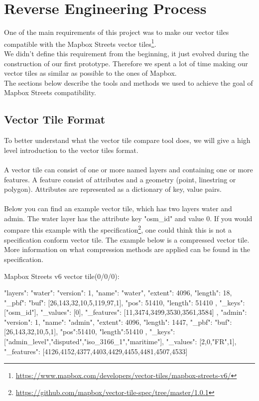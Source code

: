 \section{Reverse Engineering Process}\label{reverse_engineering_process}
One of the main requirements of this project was to make our vector tiles compatible with the Mapbox Streets vector tiles\footnote{\url{https://www.mapbox.com/developers/vector-tiles/mapbox-streets-v6/}}.
\\
We didn't define this requirement from the beginning, it just evolved during the construction of our first prototype.
Therefore we spent a lot of time making our vector tiles as similar as possible to the ones of Mapbox.
\\
The sections below describe the tools and methods we used to achieve the goal of Mapbox Streets compatibility.

\subsection{Vector Tile Format}\label{vector_tile_format}
To better understand what the vector tile compare tool does, we will give a high level introduction to the vector tiles format.
\\\\
A vector tile can consist of one or more named layers and containing one or more features. A feature consist of attributes and a geometry (point, linestring or polygon). Attributes are represented as a dictionary of key, value pairs. 
\\\\
Below you can find an example vector tile, which has two layers water and admin. The water layer has the attribute key "osm\_id" and value 0. If you would compare this example with the specification\footnote{\url{https://github.com/mapbox/vector-tile-spec/tree/master/1.0.1}}, one could think this is not a specification conform vector tile. The example below is a compressed vector tile. More information on what compression methods are applied can be found in the specification.

Mapbox Streets v6 vector tile(0/0/0):
\begin{jsoncode}
{ 
  "layers": {
    "water": {
      "version": 1,
      "name": "water",
      "extent": 4096,
      "length": 18,
      "_pbf": {
        "buf": [26,143,32,10,5,119,97,1],
        "pos": 51410,
        "length": 51410
      },
      "_keys": ["osm_id"],
      "_values": [0],
      "_features": [11,3474,3499,3530,3561,3584] 
    },
    "admin": {
      "version": 1,
      "name": "admin",
      "extent": 4096,
      "length": 1447,
      "_pbf": {
        "buf": [26,143,32,10,5,1],
        "pos":51410,
        "length":51410
       },
      "_keys": ["admin_level","disputed","iso_3166_1","maritime"],
      "_values": [2,0,"FR",1],
      "_features": [4126,4152,4377,4403,4429,4455,4481,4507,4533]
    }
  } 
}
\end{jsoncode}



